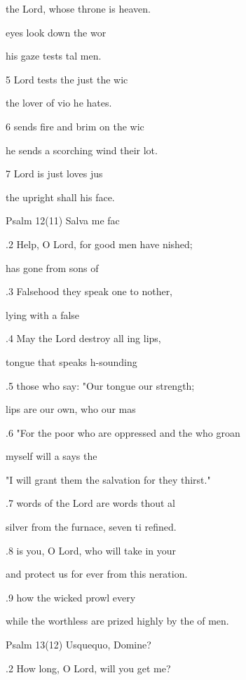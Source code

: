 the Lord, whose throne is  heaven. 

 eyes look down  the wor 

his gaze tests tal men. 

5  Lord tests the just  the wic 

the lover of vio he hates. 

6  sends fire and brim on the wic 

he sends a scorching wind  their lot. 

7  Lord is just  loves jus 

the upright shall  his face. 

Psalm 12(11) Salva me fac 


.2 Help, O Lord, for good men have nished; 

 has gone from  sons of  

.3 Falsehood they speak one to nother, 

 lying  with a false  

.4 May the Lord destroy all ing lips, 

 tongue that speaks h-sounding  

.5 those who say: "Our tongue  our strength; 

 lips are our own, who  our mas 

.6 "For the poor who are oppressed and the  who groan 

 myself will a says the  

"I will grant them the salvation for  they thirst." 

.7  words of the Lord are words thout al 

silver from the furnace, seven ti refined. 

.8  is you, O Lord, who will take  in your  

and protect us for ever from this neration. 

.9  how the wicked prowl  every  

while the worthless are prized highly by the  of men. 

Psalm 13(12) Usquequo, Domine? 


.2 How long, O Lord, will you get me? 

